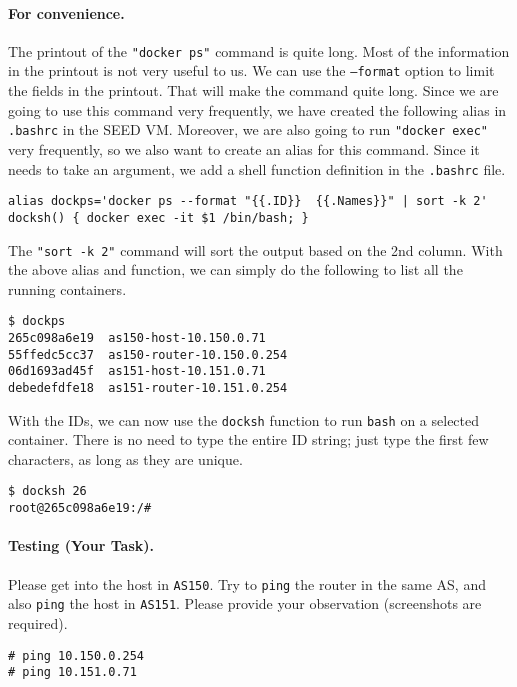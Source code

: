\paragraph{For convenience.}
The printout of the \texttt{"docker ps"} command is quite long. Most 
of the information in the printout is not very useful to us. 
We can use the \texttt{--format} option to limit the fields
in the printout. That will make the command quite long. Since 
we are going to use this command very frequently, we have
created the following alias in \texttt{.bashrc} in the SEED VM.  
Moreover, we are also going to run \texttt{"docker exec"} 
very frequently, so we also want to create an alias for 
this command. Since it needs to take an argument, we 
add a shell function definition in the \texttt{.bashrc} file. 

\begin{lstlisting}
alias dockps='docker ps --format "{{.ID}}  {{.Names}}" | sort -k 2'
docksh() { docker exec -it $1 /bin/bash; }
\end{lstlisting}
 
The \texttt{"sort -k 2"} command will sort the output based on
the 2nd column. With the above alias and function, 
we can simply do the following to list all the running containers. 

\begin{lstlisting}
$ dockps
265c098a6e19  as150-host-10.150.0.71
55ffedc5cc37  as150-router-10.150.0.254
06d1693ad45f  as151-host-10.151.0.71
debedefdfe18  as151-router-10.151.0.254
\end{lstlisting}

With the IDs, we can now use the \texttt{docksh} function to
run \texttt{bash} on a selected container. There is no need to
type the entire ID string; just type the first few characters,
as long as they are unique. 

\begin{lstlisting}
$ docksh 26
root@265c098a6e19:/#
\end{lstlisting}
 

\paragraph{Testing (Your Task).} Please get into the host in \texttt{AS150}. 
Try to \texttt{ping} the router in the same AS, and also
\texttt{ping} the host in \texttt{AS151}. Please provide your 
observation (screenshots are required).  

\begin{lstlisting}
# ping 10.150.0.254
# ping 10.151.0.71
\end{lstlisting}
 


